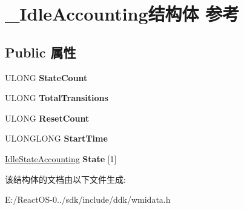 \hypertarget{struct___idle_accounting}{}\section{\+\_\+\+Idle\+Accounting结构体 参考}
\label{struct___idle_accounting}
\subsection*{Public 属性}
\begin{DoxyCompactItemize}
\item 
\mbox{\label{struct___idle_accounting_a628580614170411a597efb072b805d06}} 
U\+L\+O\+NG {\bfseries State\+Count}
\item 
\mbox{\label{struct___idle_accounting_a3fd094164675adb754972ce4452e7f83}} 
U\+L\+O\+NG {\bfseries Total\+Transitions}
\item 
\mbox{\label{struct___idle_accounting_add5daf2c6ed38f5fef8e5087ddde033b}} 
U\+L\+O\+NG {\bfseries Reset\+Count}
\item 
\mbox{\label{struct___idle_accounting_a93d3c2d30381683e99220c44a8d82c49}} 
U\+L\+O\+N\+G\+L\+O\+NG {\bfseries Start\+Time}
\item 
\mbox{\label{struct___idle_accounting_a08014ed0c2506f48f2b6db00d8ce5d77}} 
\hyperlink{struct___idle_state_accounting}{Idle\+State\+Accounting} {\bfseries State} \mbox{[}1\mbox{]}
\end{DoxyCompactItemize}


该结构体的文档由以下文件生成\+:\begin{DoxyCompactItemize}
\item 
E\+:/\+React\+O\+S-\/0../sdk/include/ddk/wmidata.\+h\end{DoxyCompactItemize}
